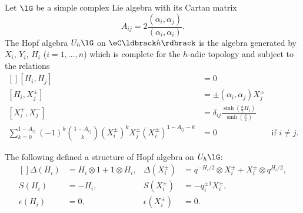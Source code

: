 \begin{definition}
	Let \( \lG\) be a simple complex Lie algebra with its Cartan matrix
	\begin{equation}
		A_{ij}=2\frac{ (\alpha_i,\alpha_j) }{ (\alpha_i,\alpha_i) }.
	\end{equation}
	The Hopf algebra \( U_h\lG\) on \( \eC\ldbrack h\rdbrack \) is the algebra generated by \( X_i\), \( Y_i\), \( H_i\) (\( i=1,\ldots,n\)) which is complete for the \( h\)-adic topology and subject to the relations
	\begin{equation}
		\begin{aligned}[]
			[H_i,H_j]                                                                                    & =0                                                                                                                   \\
			[H_i,X^{\pm}_j]                                                                              & =\pm(\alpha_i,\alpha_j)X^{\pm}_j                                                                                     \\
			[X_i^+,X_j^-]                                                                                & =\delta_{ij}\frac{ \sinh\left( \frac{ h }{2}H_i \right) }{ \sinh\left( \frac{ h }{2} \right) }                       \\
			\sum_{k=0}^{1-A_{ij}}(-1)^k\binom{1-A_{ij}}{k}(X_i^{\pm})^kX_j^{\pm}(X_i^{\pm})^{1-A_{ij}-k} & =0                                                                                             & \text{if } i\neq j.
		\end{aligned}
	\end{equation}

\end{definition}

\begin{proposition}
	The following defined a structure of Hopf algebra on \( U_h\lG\):
	\begin{equation}
		\begin{aligned}[]
			\Delta(H_i)   & =H_i\otimes 1+1\otimes H_i, & \Delta(X_i^{\pm})   & =q^{-H_i/2}\otimes X_i^{\pm}+X_i^{\pm}\otimes q^{H_i/2}, \\
			S(H_i)        & =-H_i,                      & S(X_i^{\pm})        & =-q_i^{\pm 1}X_i^{\pm},                                  \\
			\epsilon(H_i) & =0,                         & \epsilon(X_i^{\pm}) & =0.
		\end{aligned}
	\end{equation}

\end{proposition}

